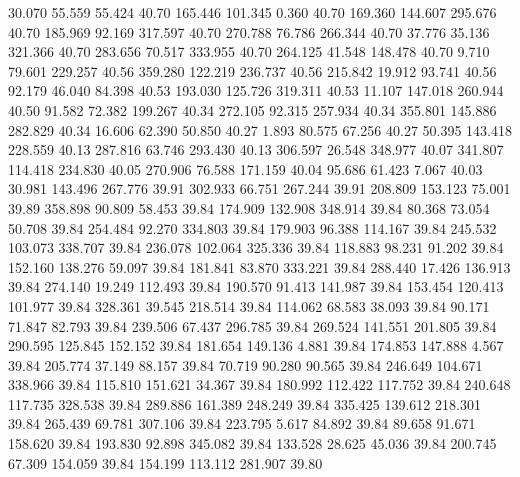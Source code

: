   30.070   55.559   55.424        40.70
 165.446  101.345    0.360        40.70
 169.360  144.607  295.676        40.70
 185.969   92.169  317.597        40.70
 270.788   76.786  266.344        40.70
  37.776   35.136  321.366        40.70
 283.656   70.517  333.955        40.70
 264.125   41.548  148.478        40.70
   9.710   79.601  229.257        40.56
 359.280  122.219  236.737        40.56
 215.842   19.912   93.741        40.56
  92.179   46.040   84.398        40.53
 193.030  125.726  319.311        40.53
  11.107  147.018  260.944        40.50
  91.582   72.382  199.267        40.34
 272.105   92.315  257.934        40.34
 355.801  145.886  282.829        40.34
  16.606   62.390   50.850        40.27
   1.893   80.575   67.256        40.27
  50.395  143.418  228.559        40.13
 287.816   63.746  293.430        40.13
 306.597   26.548  348.977        40.07
 341.807  114.418  234.830        40.05
 270.906   76.588  171.159        40.04
  95.686   61.423    7.067        40.03
  30.981  143.496  267.776        39.91
 302.933   66.751  267.244        39.91
 208.809  153.123   75.001        39.89
 358.898   90.809   58.453        39.84
 174.909  132.908  348.914        39.84
  80.368   73.054   50.708        39.84
 254.484   92.270  334.803        39.84
 179.903   96.388  114.167        39.84
 245.532  103.073  338.707        39.84
 236.078  102.064  325.336        39.84
 118.883   98.231   91.202        39.84
 152.160  138.276   59.097        39.84
 181.841   83.870  333.221        39.84
 288.440   17.426  136.913        39.84
 274.140   19.249  112.493        39.84
 190.570   91.413  141.987        39.84
 153.454  120.413  101.977        39.84
 328.361   39.545  218.514        39.84
 114.062   68.583   38.093        39.84
  90.171   71.847   82.793        39.84
 239.506   67.437  296.785        39.84
 269.524  141.551  201.805        39.84
 290.595  125.845  152.152        39.84
 181.654  149.136    4.881        39.84
 174.853  147.888    4.567        39.84
 205.774   37.149   88.157        39.84
  70.719   90.280   90.565        39.84
 246.649  104.671  338.966        39.84
 115.810  151.621   34.367        39.84
 180.992  112.422  117.752        39.84
 240.648  117.735  328.538        39.84
 289.886  161.389  248.249        39.84
 335.425  139.612  218.301        39.84
 265.439   69.781  307.106        39.84
 223.795    5.617   84.892        39.84
  89.658   91.671  158.620        39.84
 193.830   92.898  345.082        39.84
 133.528   28.625   45.036        39.84
 200.745   67.309  154.059        39.84
 154.199  113.112  281.907        39.80
